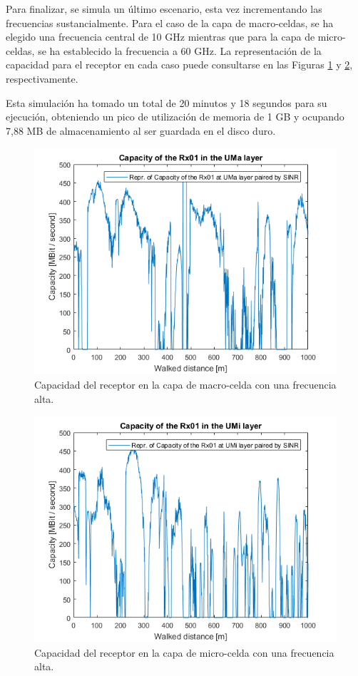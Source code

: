 Para finalizar, se simula un último escenario, esta vez incrementando las frecuencias sustancialmente. Para el caso de la capa de macro-celdas, se ha elegido una frecuencia central de 10 GHz mientras que para la capa de micro-celdas, se ha establecido la frecuencia a 60 GHz. La representación de la capacidad para el receptor en cada caso puede consultarse en las Figuras \ref{fig:simulacion_freq_max_uma} y \ref{fig:simulacion_freq_max_umi}, respectivamente.

Esta simulación ha tomado un total de 20 minutos y 18 segundos para su ejecución, obteniendo un pico de utilización de memoria de 1 GB y ocupando 7,88 MB de almacenamiento al ser guardada en el disco duro.

\begin{figure}[h!]
	\centering
    \includegraphics[width=0.8\linewidth]{imagenes/6_3_capacidad_uma_maximo.png}
	\caption{Capacidad del receptor en la capa de macro-celda con una frecuencia alta.}
	\label{fig:simulacion_freq_max_uma}
\end{figure}

\begin{figure}[h!]
	\centering
    \includegraphics[width=0.8\linewidth]{imagenes/6_3_capacidad_umi_maximo.png}
	\caption{Capacidad del receptor en la capa de micro-celda con una frecuencia alta.}
	\label{fig:simulacion_freq_max_umi}
\end{figure}

